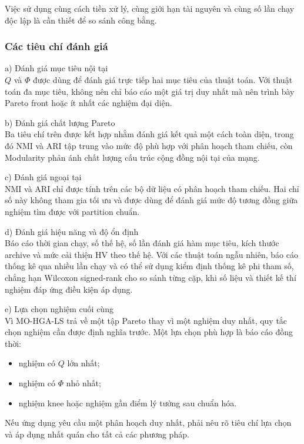 \documentclass[14pt,a4paper]{extarticle}
\begin{document}
Việc sử dụng cùng cách tiền xử lý, cùng giới hạn tài nguyên và cùng số lần chạy độc lập là cần thiết để so sánh công bằng.

\subsubsection{Các tiêu chí đánh giá}

\noindent a) Đánh giá mục tiêu nội tại \\
$Q$ và $\Phi$ được dùng để đánh giá trực tiếp hai mục tiêu của thuật toán. Với thuật toán đa mục tiêu, không nên chỉ báo cáo một giá trị duy nhất mà nên trình bày Pareto front hoặc ít nhất các nghiệm đại diện.

\noindent b) Đánh giá chất lượng Pareto \\
Ba tiêu chí trên được kết hợp nhằm đánh giá kết quả một cách toàn diện, trong đó NMI và ARI tập trung vào mức độ phù hợp với phân hoạch tham chiếu, còn Modularity phản ánh chất lượng cấu trúc cộng đồng nội tại của mạng.

\noindent c) Đánh giá ngoại tại \\
NMI và ARI chỉ được tính trên các bộ dữ liệu có phân hoạch tham chiếu. Hai chỉ số này không tham gia tối ưu và được dùng để đánh giá mức độ tương đồng giữa nghiệm tìm được với partition chuẩn.

\noindent d) Đánh giá hiệu năng và độ ổn định \\
Báo cáo thời gian chạy, số thế hệ, số lần đánh giá hàm mục tiêu, kích thước archive và mức cải thiện HV theo thế hệ. Với các thuật toán ngẫu nhiên, báo cáo thống kê qua nhiều lần chạy và có thể sử dụng kiểm định thống kê phi tham số, chẳng hạn Wilcoxon signed-rank cho so sánh từng cặp, khi số liệu và thiết kế thí nghiệm đáp ứng điều kiện áp dụng.

\noindent e) Lựa chọn nghiệm cuối cùng \\
Vì MO-HGA-LS trả về một tập Pareto thay vì một nghiệm duy nhất, quy tắc chọn nghiệm cần được định nghĩa trước. Một lựa chọn phù hợp là báo cáo đồng thời:
\begin{itemize}
    \item nghiệm có $Q$ lớn nhất;
    \item nghiệm có $\Phi$ nhỏ nhất;
    \item nghiệm knee hoặc nghiệm gần điểm lý tưởng sau chuẩn hóa.
\end{itemize}
Nếu ứng dụng yêu cầu một phân hoạch duy nhất, phải nêu rõ tiêu chí lựa chọn và áp dụng nhất quán cho tất cả các phương pháp.
\end{document}
